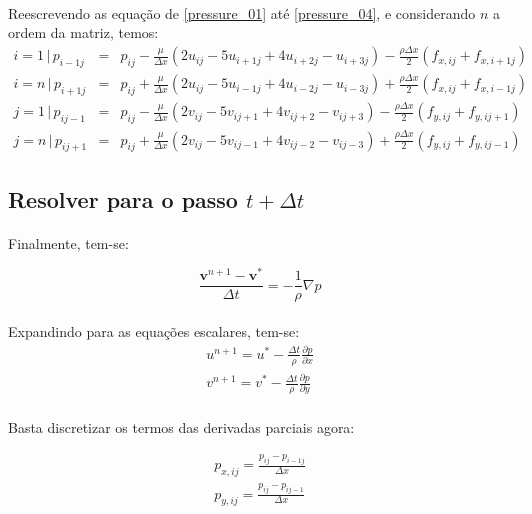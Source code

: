 \documentclass[poisson.tex]{subfiles}
\begin{document}
\paragraph{} Reescrevendo as equação de \ref{pressure_01} até \ref{pressure_04}, e considerando $n$ a ordem da matriz, temos:
\begin{eqnarray}
i=1 \,|\, p_{i-1j}&=&p_{ij}-\frac{\mu}{\Delta x}\left(2u_{ij}-5u_{i+1j}+4u_{i+2j}-u_{i+3j}\right)-\frac{\rho\Delta x}{2}(f_{x,ij}+f_{x,i+1j})\\
i=n \,|\, p_{i+1j}&=&p_{ij}+\frac{\mu}{\Delta x}\left(2u_{ij}-5u_{i-1j}+4u_{i-2j}-u_{i-3j}\right)+\frac{\rho\Delta x}{2}(f_{x,ij}+f_{x,i-1j})\\
j=1 \,|\, p_{ij-1}&=&p_{ij}-\frac{\mu}{\Delta x}\left(2v_{ij}-5v_{ij+1}+4v_{ij+2}-v_{ij+3}\right)-\frac{\rho\Delta x}{2}(f_{y,ij}+f_{y,ij+1})\\
j=n \,|\, p_{ij+1}&=&p_{ij}+\frac{\mu}{\Delta x}\left(2v_{ij}-5v_{ij-1}+4v_{ij-2}-v_{ij-3}\right)+\frac{\rho\Delta x}{2}(f_{y,ij}+f_{y,ij-1})
\end{eqnarray}
\subsection{Resolver para o passo $t+\Delta t$}
\paragraph{} Finalmente, tem-se: 

\begin{equation}
\frac{\textbf{v}^{n+1}-\textbf{v}^*}{\Delta t}=-\frac{1}{\rho}\nabla p
\end{equation}
\paragraph{} Expandindo para as equações escalares, tem-se:
\begin{eqnarray}
u^{n+1}=u^*-\frac{\Delta t}{\rho}\frac{\partial p}{\partial x}\\
v^{n+1}=v^*-\frac{\Delta t}{\rho}\frac{\partial p}{\partial y}
\end{eqnarray}
\paragraph{} Basta discretizar os termos das derivadas parciais agora:

\begin{eqnarray}
p_{x,ij}=\frac{p_{ij}-p_{i-1j}}{\Delta x}\\
p_{y,ij}=\frac{p_{ij}-p_{ij-1}}{\Delta x}
\end{eqnarray}
\end{document}
